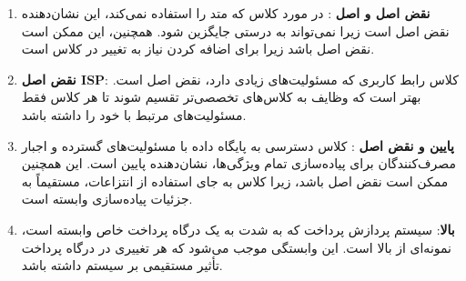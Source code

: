 \begin{enumerate}
	\item \textbf{نقض اصل  و اصل }: در مورد کلاس  که متد  را استفاده نمی‌کند، این نشان‌دهنده نقض اصل  است زیرا  نمی‌تواند به درستی جایگزین  شود. همچنین، این ممکن است نقض اصل  باشد زیرا برای اضافه کردن  نیاز به تغییر در کلاس  است.
	
	\item \textbf{نقض اصل ISP}: کلاس رابط کاربری که مسئولیت‌های زیادی دارد، نقض اصل  است. بهتر است که وظایف به کلاس‌های تخصصی‌تر تقسیم شوند تا هر کلاس فقط مسئولیت‌های مرتبط با خود را داشته باشد.
	
	\item \textbf{ پایین و نقض اصل }: کلاس دسترسی به پایگاه داده با مسئولیت‌های گسترده و اجبار مصرف‌کنندگان برای پیاده‌سازی تمام ویژگی‌ها، نشان‌دهنده  پایین است. این همچنین ممکن است نقض اصل  باشد، زیرا کلاس به جای استفاده از انتزاعات، مستقیماً به جزئیات پیاده‌سازی وابسته است.
	
	\item \textbf{ بالا}: سیستم پردازش پرداخت که به شدت به یک درگاه پرداخت خاص وابسته است، نمونه‌ای از  بالا است. این وابستگی موجب می‌شود که هر تغییری در درگاه پرداخت تأثیر مستقیمی بر سیستم داشته باشد.
\end{enumerate}